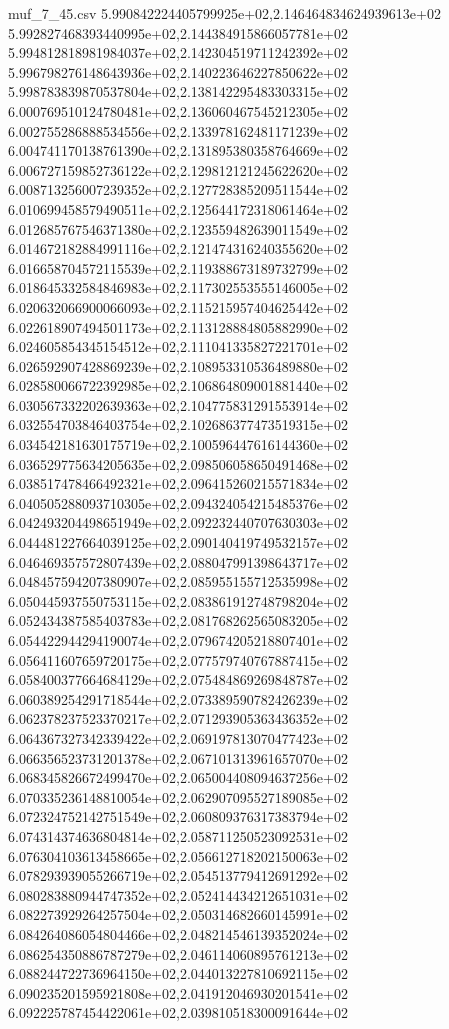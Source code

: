 \begin{filecontents*}{muf_7_45.csv}
5.990842224405799925e+02,2.146464834624939613e+02
5.992827468393440995e+02,2.144384915866057781e+02
5.994812818981984037e+02,2.142304519711242392e+02
5.996798276148643936e+02,2.140223646227850622e+02
5.998783839870537804e+02,2.138142295483303315e+02
6.000769510124780481e+02,2.136060467545212305e+02
6.002755286888534556e+02,2.133978162481171239e+02
6.004741170138761390e+02,2.131895380358764669e+02
6.006727159852736122e+02,2.129812121245622620e+02
6.008713256007239352e+02,2.127728385209511544e+02
6.010699458579490511e+02,2.125644172318061464e+02
6.012685767546371380e+02,2.123559482639011549e+02
6.014672182884991116e+02,2.121474316240355620e+02
6.016658704572115539e+02,2.119388673189732799e+02
6.018645332584846983e+02,2.117302553555146005e+02
6.020632066900066093e+02,2.115215957404625442e+02
6.022618907494501173e+02,2.113128884805882990e+02
6.024605854345154512e+02,2.111041335827221701e+02
6.026592907428869239e+02,2.108953310536489880e+02
6.028580066722392985e+02,2.106864809001881440e+02
6.030567332202639363e+02,2.104775831291553914e+02
6.032554703846403754e+02,2.102686377473519315e+02
6.034542181630175719e+02,2.100596447616144360e+02
6.036529775634205635e+02,2.098506058650491468e+02
6.038517478466492321e+02,2.096415260215571834e+02
6.040505288093710305e+02,2.094324054215485376e+02
6.042493204498651949e+02,2.092232440707630303e+02
6.044481227664039125e+02,2.090140419749532157e+02
6.046469357572807439e+02,2.088047991398643717e+02
6.048457594207380907e+02,2.085955155712535998e+02
6.050445937550753115e+02,2.083861912748798204e+02
6.052434387585403783e+02,2.081768262565083205e+02
6.054422944294190074e+02,2.079674205218807401e+02
6.056411607659720175e+02,2.077579740767887415e+02
6.058400377664684129e+02,2.075484869269848787e+02
6.060389254291718544e+02,2.073389590782426239e+02
6.062378237523370217e+02,2.071293905363436352e+02
6.064367327342339422e+02,2.069197813070477423e+02
6.066356523731201378e+02,2.067101313961657070e+02
6.068345826672499470e+02,2.065004408094637256e+02
6.070335236148810054e+02,2.062907095527189085e+02
6.072324752142751549e+02,2.060809376317383794e+02
6.074314374636804814e+02,2.058711250523092531e+02
6.076304103613458665e+02,2.056612718202150063e+02
6.078293939055266719e+02,2.054513779412691292e+02
6.080283880944747352e+02,2.052414434212651031e+02
6.082273929264257504e+02,2.050314682660145991e+02
6.084264086054804466e+02,2.048214546139352024e+02
6.086254350886787279e+02,2.046114060895761213e+02
6.088244722736964150e+02,2.044013227810692115e+02
6.090235201595921808e+02,2.041912046930201541e+02
6.092225787454422061e+02,2.039810518300091644e+02

\end{filecontents*}
